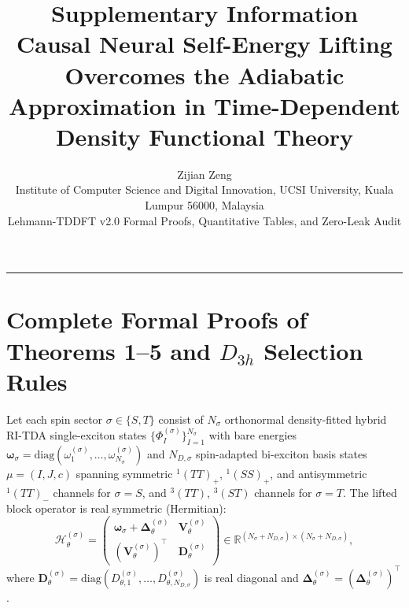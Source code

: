 \documentclass[10pt,a4paper]{article}
\title{\textbf{\sffamily Supplementary Information}\\[6pt]
\large\sffamily Causal Neural Self-Energy Lifting Overcomes the Adiabatic Approximation in Time-Dependent Density Functional Theory}
\author{\sffamily Zijian Zeng\\{\small Institute of Computer Science and Digital Innovation, UCSI University, Kuala Lumpur 56000, Malaysia}\\{\small Lehmann-TDDFT v2.0 Formal Proofs, Quantitative Tables, and Zero-Leak Audit}}
\date{}
\newcommand{\Hlift}{\mathcal{H}_\theta^{(\sigma)}}
\begin{document}
\maketitle
\tableofcontents
\vspace{8pt}
\hrule
\vspace{8pt}

\section{Complete Formal Proofs of Theorems 1--5 and \texorpdfstring{$D_{3h}$}{D3h} Selection Rules}

Let each spin sector $\sigma\in\{S,T\}$ consist of $N_\sigma$ orthonormal density-fitted hybrid RI-TDA single-exciton states $\{\Phi_I^{(\sigma)}\}_{I=1}^{N_\sigma}$ with bare energies $\boldsymbol{\omega}_\sigma=\mathrm{diag}(\omega_1^{(\sigma)},\dots,\omega_{N_\sigma}^{(\sigma)})$ and $N_{D,\sigma}$ spin-adapted bi-exciton basis states $\mu=(I,J,c)$ spanning symmetric $^1(TT)_+$, $^1(SS)_+$, and antisymmetric $^1(TT)_-$ channels for $\sigma=S$, and $^3(TT)$, $^3(ST)$ channels for $\sigma=T$.
The lifted block operator is real symmetric (Hermitian):
\begin{equation}
\Hlift = \begin{pmatrix}
\boldsymbol{\omega}_\sigma + \boldsymbol{\Delta}_\theta^{(\sigma)} & \mathbf{V}_\theta^{(\sigma)} \\
(\mathbf{V}_\theta^{(\sigma)})^\top & \mathbf{D}_\theta^{(\sigma)}
\end{pmatrix} \in \mathbb{R}^{(N_\sigma+N_{D,\sigma})\times(N_\sigma+N_{D,\sigma})},
\end{equation}
where $\mathbf{D}_\theta^{(\sigma)}=\mathrm{diag}(D_{\theta,1}^{(\sigma)},\dots,D_{\theta,N_{D,\sigma}}^{(\sigma)})$ is real diagonal and $\boldsymbol{\Delta}_\theta^{(\sigma)}=(\boldsymbol{\Delta}_\theta^{(\sigma)})^\top$.
\end{document}
